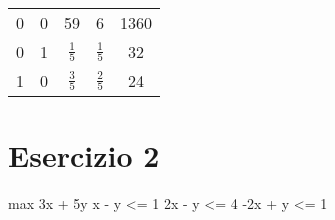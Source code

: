 \begin{center}
    \begin{tabular}{|c|c|c|c|c|}
        0 & 0 & 59 & 6 & 1360 \\
        0 & 1 & $\frac 1 5$ & $\frac 1 5$ & 32 \\
        1 & 0 & $\frac 3 5$ & $\frac 2 5$ & 24 \\
    \end{tabular}
\end{center}

\section{Esercizio 2}

max 3x + 5y
x - y <= 1
2x - y <= 4
-2x + y <= 1
